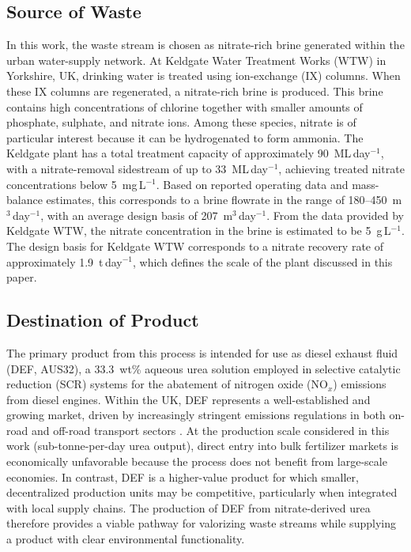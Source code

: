 \documentclass[letterpaper]{article}
\begin{document}
\subsection{Source of Waste}
In this work, the waste stream is chosen as nitrate-rich brine
generated within the urban water-supply network. At Keldgate Water
Treatment Works (WTW) in Yorkshire, UK, drinking water is treated
using ion-exchange (IX) columns. When these IX columns are
regenerated, a nitrate-rich brine is produced. This brine contains
high concentrations of chlorine together with smaller amounts of
phosphate, sulphate, and nitrate ions. Among these species, nitrate
is of particular interest because it can be hydrogenated to form
ammonia. The Keldgate plant has a total treatment capacity of
approximately 90~ML\,day$^{-1}$, with a nitrate-removal sidestream
of up to 33~ML\,day$^{-1}$, achieving treated nitrate
concentrations below 5~mg\,L$^{-1}$. Based on reported
operating data \cite{Corrigan2010} and mass-balance estimates, this
corresponds to a brine flowrate in the range of
180--450~m$^3$\,day$^{-1}$, with an average design basis of
207~m$^3$\,day$^{-1}$. From the data provided by Keldgate
WTW, the nitrate concentration in the brine is estimated to be
5~g\,L$^{-1}$. The design basis for Keldgate WTW corresponds to
a nitrate recovery rate of approximately 1.9~t\,day$^{-1}$, which
defines the scale of the plant discussed in this paper.

\subsection{Destination of Product}
The primary product from this process is intended for use as diesel
exhaust fluid (DEF, AUS32), a 33.3~wt\% aqueous urea solution
employed in selective catalytic reduction (SCR) systems for the
abatement of nitrogen oxide (NO$_x$) emissions from diesel
engines. Within the UK, DEF represents a well-established and growing
market, driven by increasingly stringent emissions regulations in
both on-road and off-road transport sectors \cite{Koebel2000}. At the
production scale considered in this work (sub-tonne-per-day urea
output), direct entry into bulk fertilizer markets is economically
unfavorable because the process does not benefit from large-scale
economies. In contrast, DEF is a higher-value product for which
smaller, decentralized production units may be competitive,
particularly when integrated with local supply chains. The production
of DEF from nitrate-derived urea therefore provides a viable pathway
for valorizing waste streams while supplying a product with clear
environmental functionality.
\end{document}
